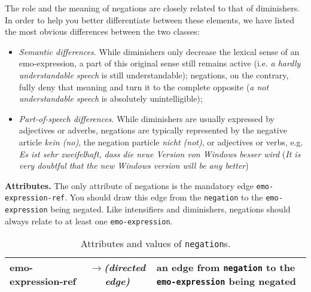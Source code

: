 \documentclass[11pt,a4paper]{article}
\newlength{\clmnwidth}
\theoremstyle{mytheoremstyle}
\begin{document}
The role and the meaning of negations are closely related to that of
diminishers.  In order to help you better differentiate between these
elements, we have listed the most obvious differences between the two
classes:
\begin{itemize}
  \item\textit{Semantic differences}.  While diminishers only decrease
    the lexical sense of an emo-expression, a part of this original
    sense still remains active (i.e. \textit{a hardly understandable
      speech} is still understandable); negations, on the contrary,
    fully deny that meaning and turn it to the complete opposite
    (\textit{a not understandable speech} is absolutely
    unintelligible);

  \item\textit{Part-of-speech differences}.  While diminishers are
    usually expressed by adjectives or adverbs, negations are
    typically represented by the negative article \textit{kein (no)},
    the negation particle \textit{nicht (not)}, or adjectives or
    verbs, e.g.  \textit{Es ist sehr zweifelhaft, dass die neue
      Version von Windows besser wird} (\textit{It is very doubtful
      that the new Windows version will be any better})

\end{itemize}

\noindent\textbf{Attributes.} The only attribute of negations is the
mandatory edge \texttt{emo-expression-ref}.  You should draw this edge
from the \texttt{negation} to the \texttt{emo-expression} being
negated.  Like intensifiers and diminishers, negations should always
relate to at least one \texttt{emo-expression}.
\begin{center}
  \begin{table}
    \caption{Attributes and values of \texttt{negation}s.}
    \begin{tabular}{|l|c|p{0.875\clmnwidth}|}\hline
      emo-expression-ref & \textit{$\longrightarrow$\newline(directed
        edge)} & an edge from \texttt{negation} to the
      \texttt{emo-expression} being negated\\\hline
    \end{tabular}
    \label{tbl:negation}
  \end{table}
\end{center}
\end{document}
